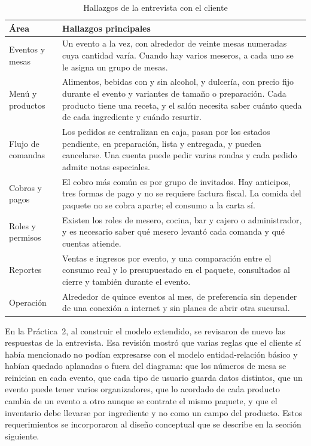 \begin{table}[H]
    \centering
    \small
    \begin{tabularx}{\textwidth}
        {
            >{\RaggedRight\arraybackslash}p{3.2cm}
            >{\RaggedRight\arraybackslash}X
        }
        \toprule
        \textbf{Área} & \textbf{Hallazgos principales} \\
        \midrule
        Eventos y mesas & Un evento a la vez, con alrededor de veinte mesas numeradas cuya cantidad varía. Cuando hay varios meseros, a cada uno se le asigna un grupo de mesas. \\
        Menú y productos & Alimentos, bebidas con y sin alcohol, y dulcería, con precio fijo durante el evento y variantes de tamaño o preparación. Cada producto tiene una receta, y el salón necesita saber cuánto queda de cada ingrediente y cuándo resurtir. \\
        Flujo de comandas & Los pedidos se centralizan en caja, pasan por los estados pendiente, en preparación, lista y entregada, y pueden cancelarse. Una cuenta puede pedir varias rondas y cada pedido admite notas especiales. \\
        Cobros y pagos & El cobro más común es por grupo de invitados. Hay anticipos, tres formas de pago y no se requiere factura fiscal. La comida del paquete no se cobra aparte; el consumo a la carta sí. \\
        Roles y permisos & Existen los roles de mesero, cocina, bar y cajero o administrador, y es necesario saber qué mesero levantó cada comanda y qué cuentas atiende. \\
        Reportes & Ventas e ingresos por evento, y una comparación entre el consumo real y lo presupuestado en el paquete, consultados al cierre y también durante el evento. \\
        Operación & Alrededor de quince eventos al mes, de preferencia sin depender de una conexión a internet y sin planes de abrir otra sucursal. \\
        \bottomrule
    \end{tabularx}
    \captionsetup{labelfont=bf, textfont=it, labelsep=newline, justification=raggedright, singlelinecheck=false}
    \caption{Hallazgos de la entrevista con el cliente}
    \label{tab:entrevista}
\end{table}

En la Práctica~2, al construir el modelo extendido, se revisaron de nuevo las respuestas de la entrevista. Esa revisión mostró que varias reglas que el cliente sí había mencionado no podían expresarse con el modelo entidad-relación básico y habían quedado aplanadas o fuera del diagrama: que los números de mesa se reinician en cada evento, que cada tipo de usuario guarda datos distintos, que un evento puede tener varios organizadores, que lo acordado de cada producto cambia de un evento a otro aunque se contrate el mismo paquete, y que el inventario debe llevarse por ingrediente y no como un campo del producto. Estos requerimientos se incorporaron al diseño conceptual que se describe en la sección siguiente.

